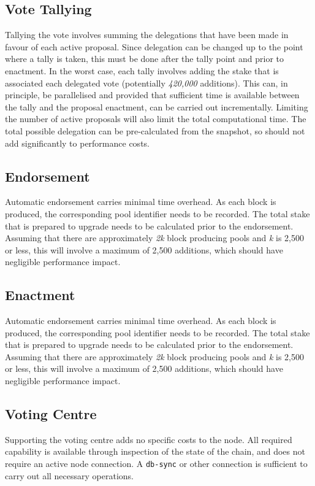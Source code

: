 \subsection{Vote Tallying}

Tallying the vote involves summing the delegations that have been made in favour of each active proposal.  Since delegation can be
changed up to the point where a tally is taken, this must be done after the tally point and prior to enactment.
In the worst case, each tally involves adding the stake that is associated each delegated vote (potentially \emph{420,000}
additions).  This can, in principle, be parallelised and provided that sufficient time is available between the tally
and the proposal enactment, can be carried out incrementally.  Limiting the number of active proposals will also
limit the total computational time.
The total possible delegation can be pre-calculated from the snapshot, so should not add significantly to performance costs.

\subsection{Endorsement}

Automatic endorsement carries minimal time overhead.  As each block is produced, the corresponding  pool identifier needs to be
recorded.  The total stake that is prepared to upgrade needs to be calculated prior to the endorsement.  Assuming that there are
approximately \emph{2k} block producing pools and \emph{k} is 2,500 or less, this will involve a maximum of 2,500 additions,
which should have negligible performance impact.

\subsection{Enactment}

Automatic endorsement carries minimal time overhead.  As each block is produced, the corresponding  pool identifier needs to be
recorded.  The total stake that is prepared to upgrade needs to be calculated prior to the endorsement.  Assuming that there are
approximately \emph{2k} block producing pools and \emph{k} is 2,500 or less, this will involve a maximum of 2,500 additions,
which should have negligible performance impact.

\subsection{Voting Centre}

Supporting the voting centre adds no specific costs to the node.  All required capability is available through inspection of
the state of the chain, and does not require an active node connection.  A \texttt{db-sync} or other connection is sufficient
to carry out all necessary operations.
